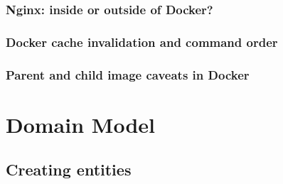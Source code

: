 \documentclass{article}
\begin{document}
\subsubsection{Nginx: inside or outside of Docker?}

\subsubsection{Docker cache invalidation and command order}

\subsubsection{Parent and child image caveats in Docker}

\section{Domain Model}

\subsection{Creating entities}
\end{document}
